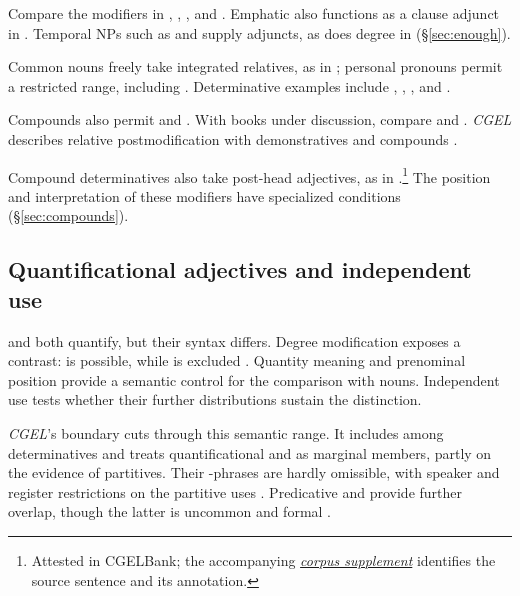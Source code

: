 \documentclass[12pt]{article}
\begin{document}
Compare the modifiers in , , , and . Emphatic  also functions as a clause adjunct in  \citep[1496--1497]{huddleston2002}. Temporal NPs such as  and  supply adjuncts, as does degree  in  (§\ref{sec:enough}).

Common nouns freely take integrated relatives, as in ; personal pronouns permit a restricted range, including  \citep[430]{huddleston2002}. Determinative examples include , , , and .

Compounds also permit  and . With books under discussion, compare  and . \textit{CGEL} describes relative postmodification with demonstratives and compounds \citep[414, 422--423]{huddleston2002}.

Compound determinatives also take post-head adjectives, as in .\footnote{Attested in CGELBank; the accompanying \href{run:corpus-documentation.pdf}{\textit{corpus supplement}} identifies the source sentence and its annotation.} The position and interpretation of these modifiers have specialized conditions (§\ref{sec:compounds}).

\subsection{Quantificational adjectives and independent use}\label{sec:quant-controls}

 and  both quantify, but their syntax differs. Degree modification exposes a contrast:  is possible, while  is excluded \citep[539--540]{huddleston2002}. Quantity meaning and prenominal position provide a semantic control for the comparison with nouns. Independent use tests whether their further distributions sustain the distinction.

\textit{CGEL}'s boundary cuts through this semantic range. It includes  among determinatives and treats quantificational  and  as marginal members, partly on the evidence of partitives. Their -phrases are hardly omissible, with speaker and register restrictions on the partitive uses \citep[392--393, 411--413]{huddleston2002}. Predicative  and  provide further overlap, though the latter is uncommon and formal \citep[392, 395--396]{huddleston2002}.
\end{document}
